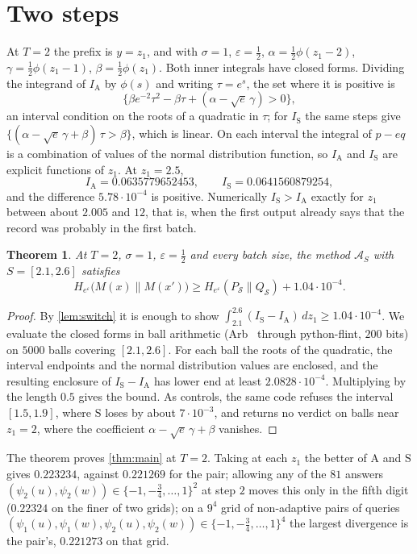 \documentclass[11pt]{amsart}
\newtheorem{theorem}{Theorem}[section]
\theoremstyle{definition}
\theoremstyle{remark}
\newcommand{\ANTI}{\mathrm{A}}
\newcommand{\SAME}{\mathrm{S}}
\newcommand{\He}{H_{e^{\varepsilon}}}
\begin{document}
\section{Two steps}\label{sec:T2}

At $T=2$ the prefix is $y=z_1$, and with $\sigma=1$, $\varepsilon=\frac12$, $\alpha=\frac12\phi(z_1-2)$, $\gamma=\frac12\phi(z_1-1)$, $\beta=\frac12\phi(z_1)$. Both inner integrals have closed forms. Dividing the integrand of $I_{\ANTI}$ by $\phi(s)$ and writing $\tau=e^{s}$, the set where it is positive is
\[
\{\beta e^{-2}\tau^2-\beta\tau+(\alpha-\sqrt e\,\gamma)>0\},
\]
an interval condition on the roots of a quadratic in $\tau$; for $I_{\SAME}$ the same steps give $\{(\alpha-\sqrt e\,\gamma+\beta)\,\tau>\beta\}$, which is linear. On each interval the integral of $p-e q$ is a combination of values of the normal distribution function, so $I_{\ANTI}$ and $I_{\SAME}$ are explicit functions of $z_1$. At $z_1=2.5$,
\[
I_{\ANTI}=0.0635779652453,\qquad I_{\SAME}=0.0641560879254,
\]
and the difference $5.78\cdot10^{-4}$ is positive. Numerically $I_{\SAME}>I_{\ANTI}$ exactly for $z_1$ between about $2.005$ and $12$, that is, when the first output already says that the record was probably in the first batch.

\begin{theorem}\label{thm:T2}
At $T=2$, $\sigma=1$, $\varepsilon=\frac12$ and every batch size, the method $\mathcal A_S$ with $S=[2.1,2.6]$ satisfies
\[
\He\bigl(M(x)\|M(x')\bigr)\ge\He(P_{\mathcal S}\|Q_{\mathcal S})+1.04\cdot10^{-4}.
\]
\end{theorem}

\begin{proof}
By \cref{lem:switch} it is enough to show $\int_{2.1}^{2.6}(I_{\SAME}-I_{\ANTI})\,dz_1\ge1.04\cdot10^{-4}$. We evaluate the closed forms in ball arithmetic (Arb~\cite{Joh17} through python-flint, $200$ bits) on $5000$ balls covering $[2.1,2.6]$. For each ball the roots of the quadratic, the interval endpoints and the normal distribution values are enclosed, and the resulting enclosure of $I_{\SAME}-I_{\ANTI}$ has lower end at least $2.0828\cdot10^{-4}$. Multiplying by the length $0.5$ gives the bound. As controls, the same code refuses the interval $[1.5,1.9]$, where $\SAME$ loses by about $7\cdot10^{-3}$, and returns no verdict on balls near $z_1=2$, where the coefficient $\alpha-\sqrt e\,\gamma+\beta$ vanishes.
\end{proof}

The theorem proves \cref{thm:main} at $T=2$. Taking at each $z_1$ the better of $\ANTI$ and $\SAME$ gives $0.223234$, against $0.221269$ for the pair; allowing any of the $81$ answers $(\psi_2(u),\psi_2(w))\in\{-1,-\frac34,\dots,1\}^2$ at step $2$ moves this only in the fifth digit ($0.22324$ on the finer of two grids); on a $9^4$ grid of non-adaptive pairs of queries $(\psi_1(u),\psi_1(w),\psi_2(u),\psi_2(w))\in\{-1,-\frac34,\dots,1\}^4$ the largest divergence is the pair's, $0.221273$ on that grid.
\end{document}
